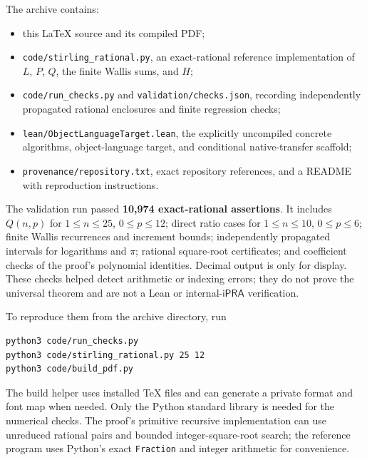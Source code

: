 \documentclass[11pt]{article}
\theoremstyle{definition}
\newcommand{\ipra}{\mathsf{iPRA}}
\begin{document}
The archive contains:
\begin{itemize}
\item this LaTeX source and its compiled PDF;
\item \texttt{code/stirling\_rational.py}, an exact-rational reference
implementation of $L$, $P$, $Q$, the finite Wallis sums, and $H$;
\item \texttt{code/run\_checks.py} and
\texttt{validation/checks.json}, recording independently propagated
rational enclosures and finite regression checks;
\item \texttt{lean/ObjectLanguageTarget.lean}, the explicitly
uncompiled concrete algorithms, object-language target, and conditional
native-transfer scaffold;
\item \texttt{provenance/repository.txt}, exact repository references,
and a README with reproduction instructions.
\end{itemize}

The validation run passed \textbf{10,974 exact-rational assertions}.
It includes $Q(n,p)$ for $1\le n\le25$, $0\le p\le12$; direct
ratio cases for $1\le n\le10$, $0\le p\le6$; finite Wallis
recurrences and increment bounds; independently propagated intervals for
logarithms and $\pi$; rational square-root certificates; and
coefficient checks of the proof's polynomial identities. Decimal output
is only for display. These checks helped detect arithmetic or indexing
errors; they do not prove the universal theorem and are not a Lean or
internal-$\ipra$ verification.

To reproduce them from the archive directory, run
\begin{lstlisting}
python3 code/run_checks.py
python3 code/stirling_rational.py 25 12
python3 code/build_pdf.py
\end{lstlisting}
The build helper uses installed TeX files and can generate a private format
and font map when needed. Only the Python standard library is needed for
the numerical checks.
The proof's primitive recursive implementation can use unreduced rational
pairs and bounded integer-square-root search; the reference program uses
Python's exact \texttt{Fraction} and integer arithmetic for convenience.
\end{document}
